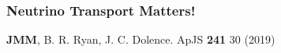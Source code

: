 \documentclass[]{beamer}
\begin{document}
\begin{frame}
  \frametitle{Neutrino Transport Matters!}
  \begin{center}
  \end{center}
  \begin{tiny}
    \textbf{JMM}, B. R. Ryan, J. C. Dolence. ApJS \textbf{241} 30 (2019) 
  \end{tiny}
\end{frame}

% 
\end{document}
